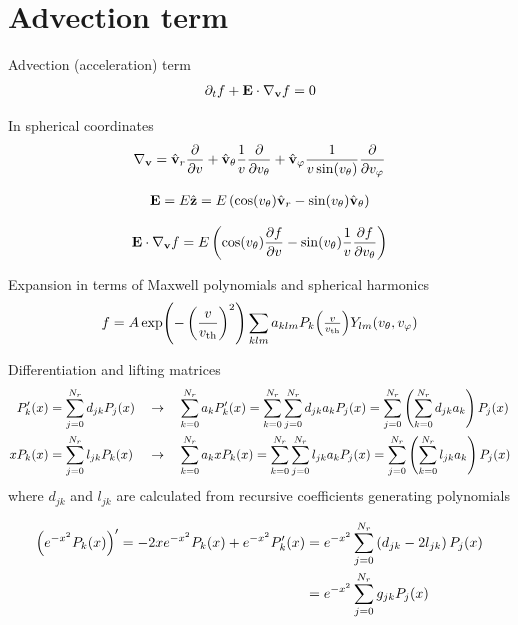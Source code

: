\documentclass{article}
\begin{document}
\clearpage
\section{Advection term}
Advection (acceleration) term
\begin{align*}
\partial_t f + \mathbf{E}\cdot \nabla_{\mathbf{v}} f = 0
\end{align*}

In spherical coordinates
\begin{align*}
\nabla_{\vect{v}} 
= \vrunit \frac{\partial}{\partial \vr}
+ \vthetaunit \frac{1}{\vr} \frac{\partial}{\partial \vtheta}
+ \vphiunit \frac{1}{\vr \sin\of{\vtheta}} \frac{\partial}{\partial \vphi}
\end{align*}

\begin{align*}
\vect{E} 
= E \hat{\vect{z}} 
= E \left( \cos\of{\vtheta} \vrunit - \sin\of{\vtheta} \vthetaunit \right)
\end{align*}


\begin{align*}
\vect{E}\cdot \nabla_{\vect{v}} f
= E 
\left( \cos\of{\vtheta} \frac{\partial f}{\partial \vr} 
- \sin\of{\vtheta} \frac{1}{\vr} \frac{\partial f}{\partial \vtheta} \right)
\end{align*}

Expansion in terms of Maxwell polynomials and spherical harmonics
\begin{align*}
f = A 
\exp\of{-\left(\frac{\vr}{\vth}\right)^2} 
\sum_{klm} a_{klm} P_k\of{\textstyle\frac{v}{\vth}} Y_{lm}\of{\vtheta,\vphi}
\end{align*}

Differentiation and lifting matrices
\begin{align*}
P^\prime_k\of{x} &= \sum_{j=0}^{N_r} d_{jk} P_j\of{x}
&
&\rightarrow \quad
\sum_{k=0}^{N_r} a_k P^\prime_k\of{x} 
= \sum_{k=0}^{N_r} \sum_{j=0}^{N_r} d_{jk} a_k P_j\of{x}
= \sum_{j=0}^{N_r} \left( \sum_{k=0}^{N_r} d_{jk} a_k \right) P_j\of{x}
\\
x P_k\of{x} &= \sum_{j=0}^{N_r} l_{jk} P_k\of{x}
&
&\rightarrow \quad
\sum_{k=0}^{N_r} a_k x P_k\of{x} 
= \sum_{k=0}^{N_r} \sum_{j=0}^{N_r} l_{jk} a_k P_j\of{x}
= \sum_{j=0}^{N_r} \left( \sum_{k=0}^{N_r} l_{jk} a_k \right) P_j\of{x}
\end{align*}
where $d_{jk}$ and $l_{jk}$ are calculated from recursive coefficients generating polynomials

\begin{align*}
\left( e^{-x^2} P_k\of{x} \right)^\prime
= - 2 x e^{-x^2} P_k\of{x} + e^{-x^2} P^\prime_k\of{x}
&= e^{-x^2} \sum_{j=0}^{N_r} \left( d_{jk} - 2 l_{jk} \right)P_j\of{x}
\\
&= e^{-x^2} \sum_{j=0}^{N_r} g_{jk} P_j\of{x}
\end{align*}
\end{document}
